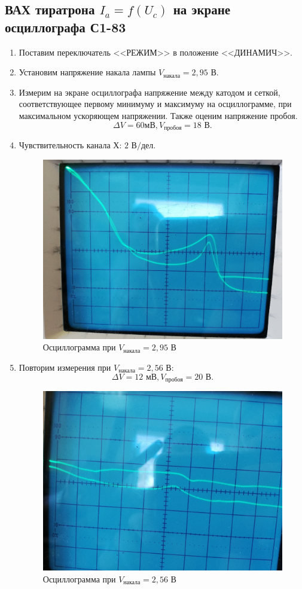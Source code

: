 \documentclass[a4paper,12pt]{article}
\theoremstyle{plain} %
\theoremstyle{definition} %
\theoremstyle{remark} %
\begin{document}
\subsection{ВАХ тиратрона $I_a = f(U_c)$ на экране осциллографа С1-83}
\begin{enumerate}
    \item Поставим переключатель <<РЕЖИМ>> в положение <<ДИНАМИЧ>>.
    \item Установим напряжение накала лампы $V_{\text{накала}} = 2,95 \text{ В}.$
    \item Измерим на экране осциллографа напряжение между катодом и сеткой, соответствующее первому минимуму и максимуму на осциллограмме, при максимальном ускоряющем напряжении. Также оценим напряжение пробоя.
    \[\Delta V = 60 \text{мВ}, V_\text{пробоя} = 18\text{ В}.\]
    \item Чувствительность канала Х: $2 \text{ В/дел}.$
\begin{figure}[H]
    \begin{center}
        \includegraphics[width= 0.6 \textwidth]{oscilloscope1.jpg}
        \end{center}
    \caption{Осциллограмма при $V_\text{накала} = 2,95 \text{ В}$}
\end{figure}

    \item Повторим измерения при $V_\text{накала} = 2,56 \text{ В}:$ 
    \[\Delta V = 12 \text{ мВ}, V_{\text{пробоя}} = 20 \text{ В}.\]
    
\begin{figure}[H]
    \begin{center}
        \includegraphics[width= 0.6 \textwidth]{oscilloscope2.jpg}
        \end{center}
    \caption{Осциллограмма при $V_\text{накала} = 2,56 \text{ В}$}
\end{figure}


\end{enumerate}
\end{document}
